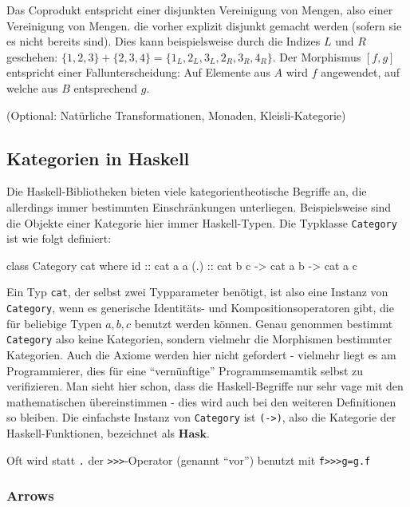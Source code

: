 \documentclass[a4paper, bibgerm]{article}
\newcommand\icode[1]{\lstinline?#1?}
\begin{document}
Das Coprodukt entspricht einer disjunkten Vereinigung von Mengen, also
einer Vereinigung von Mengen. die vorher explizit disjunkt gemacht
werden (sofern sie es nicht bereits sind). Dies kann beispielsweise durch
die Indizes $L$ und $R$ geschehen: $\{1,2,3\} + \{2,3,4\} =
\{1_L,2_L,3_L,2_R,3_R,4_R\}$. Der Morphismus $[f,g]$ entspricht einer
Fallunterscheidung: Auf Elemente aus $A$ wird $f$ angewendet, auf welche
aus $B$ entsprechend $g$.

(Optional: Natürliche Transformationen, Monaden, Kleisli-Kategorie)

\subsection{Kategorien in Haskell}
\label{sec:cats_haskell}

Die Haskell-Bibliotheken bieten viele kategorientheotische Begriffe an,
die allerdings immer bestimmten Einschränkungen
unterliegen. Beispielsweise sind die Objekte einer Kategorie hier immer
Haskell-Typen. Die Typklasse \icode{Category} ist wie folgt definiert:
\begin{code}
class Category cat where
  id   :: cat a a
  (.) :: cat b c -> cat a b -> cat a c
\end{code}
Ein Typ \icode{cat}, der selbst zwei Typparameter benötigt, ist also eine
Instanz von \icode{Category}, wenn es generische Identitäts- und
Kompositionsoperatoren gibt, die für beliebige Typen $a,b,c$ benutzt
werden können. Genau genommen bestimmt \icode{Category} also keine
Kategorien, sondern vielmehr die Morphismen bestimmter Kategorien. Auch
die Axiome werden hier nicht gefordert - vielmehr liegt es am
Programmierer, dies für eine "`vernünftige"' Programmsemamtik selbst zu
verifizieren. Man sieht hier schon, dass die Haskell-Begriffe nur sehr
vage mit den mathematischen übereinstimmen - dies wird auch bei den
weiteren Definitionen so bleiben. Die einfachste Instanz von
\icode{Category} ist \icode{(->)}, also die Kategorie der
Haskell-Funktionen, bezeichnet als $\mathbf{Hask}$.

Oft wird statt \icode{.} der \icode{>>>}-Operator (genannt "`vor"') %
benutzt mit \icode{f>>>g=g.f} %


\subsubsection{Arrows}
\label{sec:arrows}
\end{document}
